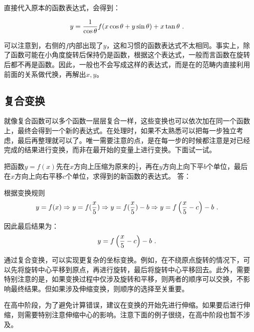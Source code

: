 直接代入原本的函数表达式，会得到：

\begin{equation}
y  ={1\over\cos \theta}f(x \cos \theta + y \sin \theta)+x \tan \theta~.
\end{equation}

可以注意到，右侧的$f$内部出现了$y$，这和习惯的函数表达式不太相同。事实上，除了函数可能在小角度旋转后保持仍是函数，根据这个表达式，一般而言函数在旋转后都不再是函数。因此，一般也不会写成这样的表达式，而是在的范畴内直接利用前面的关系做代换，再解出$x,y$。

\subsection{复合变换}

就像复合函数可以多个函数一层层复合一样，这些变换也可以依次加在同一个函数上，最终会得到一个新的表达式。在处理时，如果不太熟悉可以把每一步独立考虑，最后再整理就可以了。唯一需要注意的点，是在每一步的时候都注意是对已经完成的结果进行变换，而非在最开始的变量上进行变换。下面试一试。

\begin{exercise}{把函数$y=f(x)$先在$x$方向上压缩为原来的$\displaystyle\frac{1}{5}$，再在$y$方向上向下平$b$个单位，最后在$x$方向上向右平移$c$个单位，求得到的新函数的表达式。}
答：

根据变换规则
$$\displaystyle y=f(x)\Rightarrow y=f({x\over5})\Rightarrow y=f({x\over5})-b\Rightarrow y=f\left({{x\over 5}-c}\right)-b~.$$

因此最后结果为：
$$y=f\left({x\over 5}-c\right)-b~.$$
\end{exercise}

通过复合变换，可以实现更复杂的坐标变换。例如，在不绕原点旋转的情况下，可以先将旋转中心平移到原点，再进行旋转，最后将旋转中心平移回去。此外，需要特别注意的是，如果变换过程中仅涉及旋转和平移，则两者的顺序可以交换，不影响最终结果。但如果涉及伸缩变换，则顺序的选择至关重要。

在高中阶段，为了避免计算错误，建议在变换的开始先进行伸缩。如果要后进行伸缩，则需要特别注意伸缩中心的影响。注意下面的例子很绕，在高中阶段也暂不涉及。

